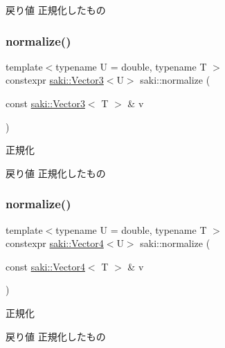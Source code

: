 \begin{DoxyReturn}{戻り値}
正規化したもの 
\end{DoxyReturn}
\mbox{\label{namespacesaki_a9d2c1a56c676217c90344612186cf3bb}} 
\subsubsection{\texorpdfstring{normalize()}{normalize()}\hspace{0.1cm}{\footnotesize\ttfamily [2/3]}}
{\footnotesize\ttfamily template$<$typename U  = double, typename T $>$ \\
constexpr \mbox{\hyperlink{classsaki_1_1_vector3}{saki\+::\+Vector3}}$<$U$>$ saki\+::normalize (\begin{DoxyParamCaption}\item[{const \mbox{\hyperlink{classsaki_1_1_vector3}{saki\+::\+Vector3}}$<$ T $>$ \&}]{v }\end{DoxyParamCaption})}



正規化 

\begin{DoxyReturn}{戻り値}
正規化したもの 
\end{DoxyReturn}
\mbox{\label{namespacesaki_a7ae70098357de6ff61013f230b7a7750}} 
\subsubsection{\texorpdfstring{normalize()}{normalize()}\hspace{0.1cm}{\footnotesize\ttfamily [3/3]}}
{\footnotesize\ttfamily template$<$typename U  = double, typename T $>$ \\
constexpr \mbox{\hyperlink{classsaki_1_1_vector4}{saki\+::\+Vector4}}$<$U$>$ saki\+::normalize (\begin{DoxyParamCaption}\item[{const \mbox{\hyperlink{classsaki_1_1_vector4}{saki\+::\+Vector4}}$<$ T $>$ \&}]{v }\end{DoxyParamCaption})}



正規化 

\begin{DoxyReturn}{戻り値}
正規化したもの 
\end{DoxyReturn}
\mbox{\label{namespacesaki_a08cb75d91d73dcb809caa1e06507ce37}} 
